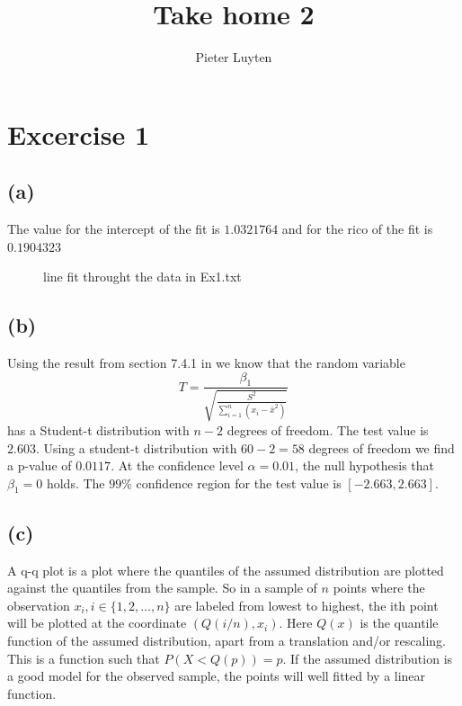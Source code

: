 \documentclass[a4paper]{article}
\title{Take home 2}
\author{Pieter Luyten}
\begin{document}
\maketitle

\section*{Excercise 1}
\subsection*{(a)}
\noindent {}

The value for the intercept of the fit is $1.0321764$ and for the rico of the fit is $0.1904323$
\begin{figure}[H]
	\centering
	
	\caption{line fit throught the data in Ex1.txt}
	\label{fig:fit-1a}
\end{figure}

\newpage
\subsection*{(b)}
\noindent {}

Using the result from section 7.4.1 in \cite{course-notes} we know that the random variable
\begin{equation*}
	T = \frac{\beta_1}{\sqrt{ \frac{S^2}{ \sum_{i=1}^{n}(x_i-\bar{x}^2)}}}
\end{equation*}
has a Student-t distribution with $n-2$ degrees of freedom. The test value is $2.603$. Using a student-t distribution with $60-2=58$ degrees of freedom we find a p-value of $0.0117$. At the confidence level $\alpha=0.01$, the null hypothesis that $\beta_1=0$ holds. The $99\%$ confidence region for the test value is $[-2.663, 2.663]$.

\subsection*{(c)}
\noindent {}

A q-q plot is a plot where the quantiles of the assumed distribution are plotted against the quantiles from the sample. So in a sample of $n$ points where the observation $x_i, i \in \{1,2, \ldots, n\}$ are labeled from lowest to highest, the ith point will be plotted at the coordinate $(Q(i/n), x_i)$.
Here $Q(x)$ is the quantile function of the assumed distribution, apart from a translation and/or rescaling. This is a function such that $ P( X < Q(p)) = p$. If the assumed distribution is a good model for the observed sample, the points will well fitted by a linear function.
\end{document}
